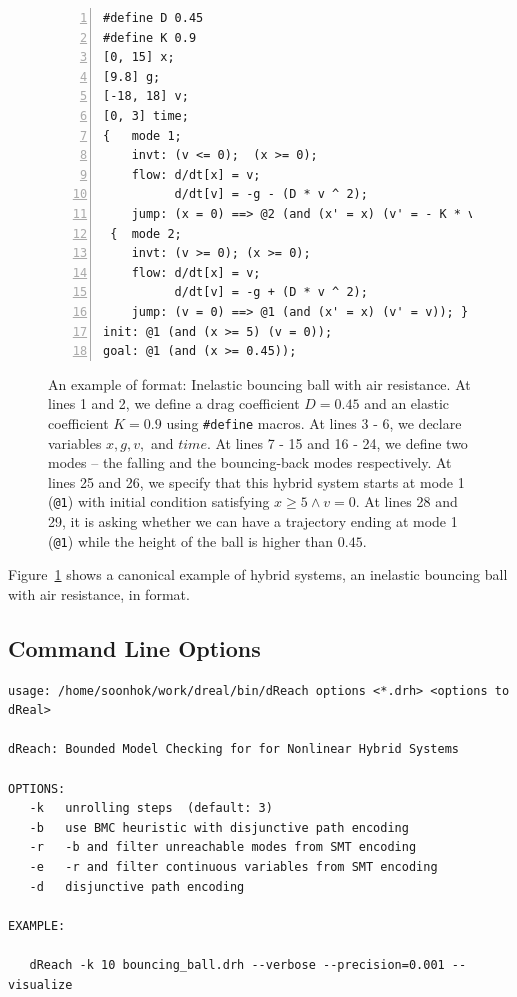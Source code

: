 \begin{figure}
  \centering
  \begin{Verbatim}[fontfamily=courier, frame=single, framesep=1mm,
  numbers=left, fontsize=\scriptsize]
#define D 0.45
#define K 0.9
[0, 15] x;
[9.8] g;
[-18, 18] v;
[0, 3] time;
{   mode 1;
    invt: (v <= 0);  (x >= 0);
    flow: d/dt[x] = v;
          d/dt[v] = -g - (D * v ^ 2);
    jump: (x = 0) ==> @2 (and (x' = x) (v' = - K * v)); }
 {  mode 2;
    invt: (v >= 0); (x >= 0);
    flow: d/dt[x] = v;
          d/dt[v] = -g + (D * v ^ 2);
    jump: (v = 0) ==> @1 (and (x' = x) (v' = v)); }
init: @1 (and (x >= 5) (v = 0));
goal: @1 (and (x >= 0.45));
\end{Verbatim}
\caption{An example of \drh{} format: Inelastic bouncing ball with air
  resistance. At lines 1 and 2, we define a drag coefficient $D = 0.45$
  and an elastic coefficient $K = 0.9$ using \texttt{\#define} macros.
  At lines 3 - 6, we declare variables $x, g, v,$ and $time$. At lines
  7 - 15 and 16 - 24, we define two modes -- the falling and the
  bouncing-back modes respectively. At lines 25 and 26, we specify
  that this hybrid system starts at mode 1 (\texttt{@1}) with initial
  condition satisfying $x \ge 5 \land v = 0$. At lines 28 and 29, it
  is asking whether we can have a trajectory ending at mode 1
  (\texttt{@1}) while the height of the ball is higher than $0.45$.}
\label{fig:bouncing-ball-drh}
\end{figure}

Figure~\ref{fig:bouncing-ball-drh} shows a canonical example of hybrid
systems, an inelastic bouncing ball with air resistance, in \drh{}
format.

\subsection{Command Line Options}
  \begin{Verbatim}[fontfamily=courier, frame=single, framesep=1mm, fontsize=\scriptsize]
usage: /home/soonhok/work/dreal/bin/dReach options <*.drh> <options to dReal>

dReach: Bounded Model Checking for for Nonlinear Hybrid Systems

OPTIONS:
   -k   unrolling steps  (default: 3)
   -b   use BMC heuristic with disjunctive path encoding
   -r   -b and filter unreachable modes from SMT encoding
   -e   -r and filter continuous variables from SMT encoding
   -d   disjunctive path encoding

EXAMPLE:

   dReach -k 10 bouncing_ball.drh --verbose --precision=0.001 --visualize

\end{Verbatim}

